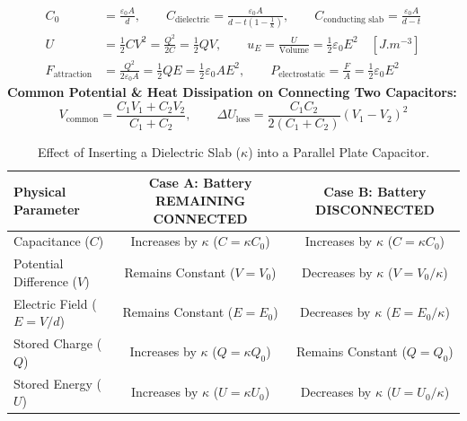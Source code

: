 \documentclass[11pt,a4paper]{article}
\begin{document}
\begin{formulabox}
\begin{align}
  C_0 &= \frac{\varepsilon_0 A}{d}, \qquad C_{\text{dielectric}} = \frac{\varepsilon_0 A}{d - t\left(1 - \frac{1}{\kappa}\right)}, \qquad C_{\text{conducting slab}} = \frac{\varepsilon_0 A}{d - t} \\
  U &= \frac{1}{2}CV^2 = \frac{Q^2}{2C} = \frac{1}{2}QV, \qquad u_E = \frac{U}{\text{Volume}} = \frac{1}{2}\varepsilon_0 E^2 \quad [\si{J.m^{-3}}] \\
  F_{\text{attraction}} &= \frac{Q^2}{2\varepsilon_0 A} = \frac{1}{2}QE = \frac{1}{2}\varepsilon_0 A E^2, \qquad P_{\text{electrostatic}} = \frac{F}{A} = \frac{1}{2}\varepsilon_0 E^2
\end{align}
\textbf{Common Potential \& Heat Dissipation on Connecting Two Capacitors:}
\begin{equation}
  V_{\text{common}} = \frac{C_1 V_1 + C_2 V_2}{C_1 + C_2}, \qquad \Delta U_{\text{loss}} = \frac{C_1 C_2}{2(C_1 + C_2)}(V_1 - V_2)^2
\end{equation}
\end{formulabox}

\begin{table}[htbp]
\centering
\small
\renewcommand{\arraystretch}{1.2}
\begin{tabularx}{\textwidth}{L c c}
\toprule
\textbf{Physical Parameter} & \textbf{Case A: Battery REMAINING CONNECTED} & \textbf{Case B: Battery DISCONNECTED} \\
\midrule
Capacitance ($C$) & Increases by $\kappa$ ($C = \kappa C_0$) & Increases by $\kappa$ ($C = \kappa C_0$) \\
Potential Difference ($V$) & Remains Constant ($V = V_0$) & Decreases by $\kappa$ ($V = V_0/\kappa$) \\
Electric Field ($E = V/d$) & Remains Constant ($E = E_0$) & Decreases by $\kappa$ ($E = E_0/\kappa$) \\
Stored Charge ($Q$) & Increases by $\kappa$ ($Q = \kappa Q_0$) & Remains Constant ($Q = Q_0$) \\
Stored Energy ($U$) & Increases by $\kappa$ ($U = \kappa U_0$) & Decreases by $\kappa$ ($U = U_0/\kappa$) \\
\bottomrule
\end{tabularx}
\caption{Effect of Inserting a Dielectric Slab ($\kappa$) into a Parallel Plate Capacitor.}
\end{table}
\end{document}
